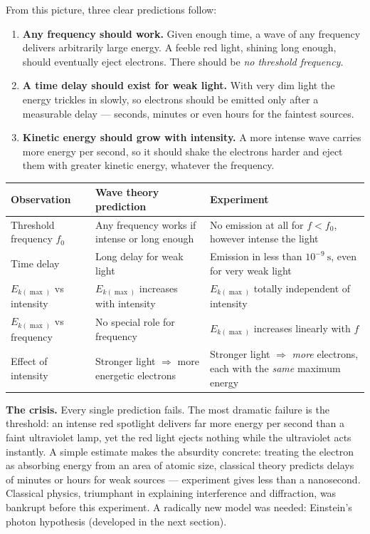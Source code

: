 \documentclass[11pt]{article}
\begin{document}
From this picture, three clear predictions follow:

\begin{enumerate}
\item \textbf{Any frequency should work.} Given enough time, a wave of any frequency delivers arbitrarily large energy. A feeble red light, shining long enough, should eventually eject electrons. There should be \emph{no threshold frequency}.
\item \textbf{A time delay should exist for weak light.} With very dim light the energy trickles in slowly, so electrons should be emitted only after a measurable delay --- seconds, minutes or even hours for the faintest sources.
\item \textbf{Kinetic energy should grow with intensity.} A more intense wave carries more energy per second, so it should shake the electrons harder and eject them with greater kinetic energy, whatever the frequency.
\end{enumerate}

\begin{center}
\begin{tabularx}{\linewidth}{|l|X|X|}
\hline
\rowcolor{popblueL} \textbf{Observation} & \textbf{Wave theory prediction} & \textbf{Experiment} \\
\hline
Threshold frequency $f_0$ & Any frequency works if intense or long enough & No emission at all for $f < f_0$, however intense the light \\
\hline
\rowcolor{popblueL} Time delay & Long delay for weak light & Emission in less than $10^{-9}\ \mathrm{s}$, even for very weak light \\
\hline
$E_{k(\max)}$ vs intensity & $E_{k(\max)}$ increases with intensity & $E_{k(\max)}$ totally independent of intensity \\
\hline
\rowcolor{popblueL} $E_{k(\max)}$ vs frequency & No special role for frequency & $E_{k(\max)}$ increases linearly with $f$ \\
\hline
Effect of intensity & Stronger light $\Rightarrow$ more energetic electrons & Stronger light $\Rightarrow$ \emph{more} electrons, each with the \emph{same} maximum energy \\
\hline
\end{tabularx}
\end{center}

\textbf{The crisis.} Every single prediction fails. The most dramatic failure is the threshold: an intense red spotlight delivers far more energy per second than a faint ultraviolet lamp, yet the red light ejects nothing while the ultraviolet acts instantly. A simple estimate makes the absurdity concrete: treating the electron as absorbing energy from an area of atomic size, classical theory predicts delays of minutes or hours for weak sources --- experiment gives less than a nanosecond. Classical physics, triumphant in explaining interference and diffraction, was bankrupt before this experiment. A radically new model was needed: Einstein's photon hypothesis (developed in the next section).
\end{document}
